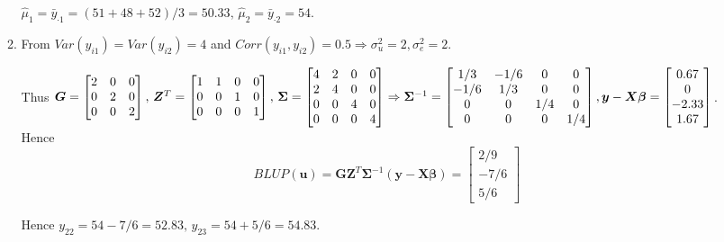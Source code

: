 \documentclass{article}
\begin{document}
\begin{enumerate}[leftmargin = 0 em, label = \arabic*., font = \bfseries]
\begin{enumerate}
		$\hat{\mu}_1 = \bar{y}_{\cdot 1} = (51 + 48 + 52) / 3 = 50.33,\, \hat{\mu}_2 = \bar{y}_{\cdot 2} = 54$.

		 \item 
		 From $Var(y_{i1}) = Var(y_{i2}) = 4$ and $Corr(y_{i1}, y_{i2}) = 0.5 \Rightarrow \sigma_u^2 = 2, \sigma_e^2 = 2$. 

		 Thus
		 $\bm G = \begin{bmatrix}
		 	2 & 0 & 0\\
		 	0 & 2 & 0\\
		 	0 & 0 & 2
		 \end{bmatrix},\, \bm Z^T = \begin{bmatrix}
		 	1 & 1 & 0 & 0\\
		 	0 & 0 & 1 & 0\\
		 	0 & 0 & 0 & 1
		 \end{bmatrix},\, \bm \Sigma = \begin{bmatrix}
		 	4 & 2 & 0 & 0\\
		 	2 & 4 & 0 & 0\\
		 	0 & 0 & 4 & 0\\
		 	0 & 0 & 0 & 4
		 \end{bmatrix} \Rightarrow \bm \Sigma^{-1} = \begin{bmatrix}
		 	1/3 & -1/6 & 0 & 0\\
		 	-1/6 & 1/3 & 0 & 0\\
		 	0 & 0 & 1/4 & 0\\
		 	0 & 0 & 0 & 1/4
		 \end{bmatrix},\, \\
		 \bm y - \bm X \bm \beta = \begin{bmatrix}
		 	0.67 \\ 0 \\ -2.33 \\ 1.67
		 \end{bmatrix}$. Hence 
		 \[BLUP(\bm u) = \bm G \bm Z^T \bm \Sigma^{-1} (\bm y - \bm X \bm \beta) = \begin{bmatrix}
		 	2/9 \\ -7/6 \\ 5/6
		 \end{bmatrix}\]

		 Hence $y_{22} = 54 - 7/6 = 52.83,\, y_{23} = 54 + 5/6 = 54.83$. 

	\end{enumerate}
	
	
	
	
	
	
	     
\end{enumerate}
	      
\end{document}
